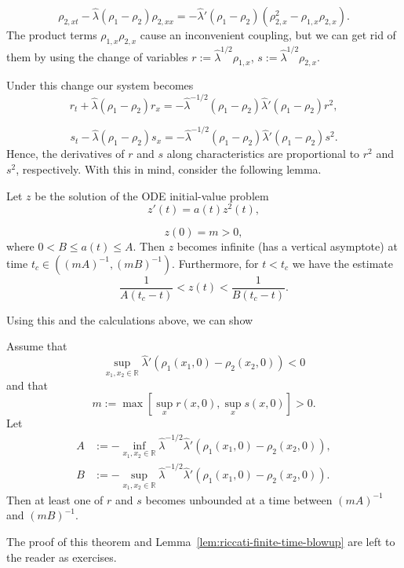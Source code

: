 \begin{equation}\label{eq:p-system-second-slope-equation}
\rho_{2,xt}-\hat\lambda(\rho_1-\rho_2)\rho_{2,xx}=-\hat\lambda'(\rho_1-\rho_2)(\rho_{2,x}^2-\rho_{1,x}\rho_{2,x}).
\end{equation}
The product terms $\rho_{1,x}\rho_{2,x}$ cause an inconvenient coupling, but we can get rid of them by using the change of variables $r:=\hat\lambda^{1/2}\rho_{1,x}$, $s:=\hat\lambda^{1/2}\rho_{2,x}$.

Under this change our system becomes
\begin{equation}\label{eq:p-system-weighted-first-slope}
r_t+\hat\lambda(\rho_1-\rho_2)r_x=-\hat\lambda^{-1/2}(\rho_1-\rho_2)\hat\lambda'(\rho_1-\rho_2)r^2,
\end{equation}

\begin{equation}\label{eq:p-system-weighted-second-slope}
s_t-\hat\lambda(\rho_1-\rho_2)s_x=-\hat\lambda^{-1/2}(\rho_1-\rho_2)\hat\lambda'(\rho_1-\rho_2)s^2.
\end{equation}
Hence, the derivatives of $r$ and $s$ along characteristics are proportional to $r^2$ and $s^2$, respectively. With this in mind, consider the following lemma.

\begin{Lemma}
\label{lem:riccati-finite-time-blowup}
Let $z$ be the solution of the ODE initial-value problem
\begin{equation}\label{eq:riccati-positive-coefficient}
z'(t)=a(t)z^2(t),
\end{equation}

\begin{equation}\label{eq:riccati-positive-initial-value}
z(0)=m>0,
\end{equation}
where $0<B\leq a(t)\leq A$. Then $z$ becomes infinite (has a vertical asymptote) at time $t_c\in((mA)^{-1},(mB)^{-1})$. Furthermore, for $t<t_c$ we have the estimate
\begin{equation}\label{eq:riccati-blowup-bounds}
\dfrac1{A(t_c-t)}<z(t)<\dfrac1{B(t_c-t)}.
\end{equation}

\end{Lemma}

Using this and the calculations above, we can show

\begin{Theorem}
\label{thm:p-system-finite-time-blowup}
Assume that
\[
\sup_{x_1,x_2\in\mathbb{R}}\hat\lambda'(\rho_1(x_1,0)-\rho_2(x_2,0))<0
\]
and that
\[
m:=\max[\sup_xr(x,0),\sup_xs(x,0)]>0.
\]
Let
\[
\begin{aligned}
A&:=-\inf_{x_1,x_2\in\mathbb{R}}\hat\lambda^{-1/2}\hat\lambda'(\rho_1(x_1,0)-\rho_2(x_2,0)),\\
B&:=-\sup_{x_1,x_2\in\mathbb{R}}\hat\lambda^{-1/2}\hat\lambda'(\rho_1(x_1,0)-\rho_2(x_2,0)).
\end{aligned}
\]
Then at least one of $r$ and $s$ becomes unbounded at a time between $(mA)^{-1}$ and $(mB)^{-1}$.
\end{Theorem}

The proof of this theorem and Lemma~\ref{lem:riccati-finite-time-blowup} are left to the reader as exercises.
